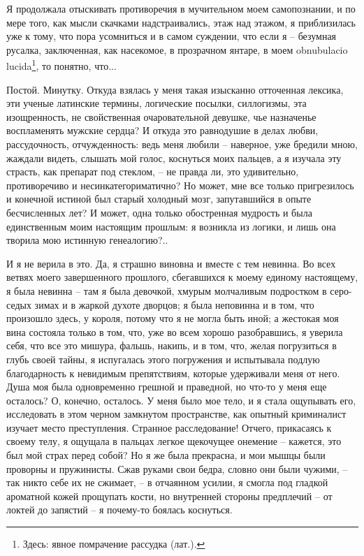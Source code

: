 Я  продолжала отыскивать  противоречия  в мучительном  моем самопознании,  и
по  мере  того,  как  мысли  скачками надстраивались,  этаж  над  этажом,  я
приблизилась уже к тому, что пора усомниться  и в самом суждении, что если я
-- безумная русалка, заключенная, как насекомое, в прозрачном янтаре, в моем
obnubulacio  lucida\footnote{Здесь: явное  помрачение рассудка  (лат.).}, то
понятно, что...

Постой.  Минутку.  Откуда  взялась  у  меня  такая изысканно отточенная
лексика, эти ученые латинские термины, логические посылки,  силлогизмы,  эта
изощренность,   не   свойственная  очаровательной  девушке,  чье  назначенье
воспламенять  мужские  сердца?  И  откуда  это  равнодушие  в  делах  любви,
рассудочность,  отчужденность:  ведь  меня  любили  -- наверное, уже бредили
мною, жаждали видеть, слышать мой голос, коснуться моих пальцев, а я изучала
эту страсть, как препарат под стеклом, -- не  правда  ли,  это  удивительно,
противоречиво  и несинкатегориматично? Но может, мне все только пригрезилось
и  конечной  истиной  был  старый  холодный  мозг,  запутавшийся   в   опыте
бесчисленных   лет?  И  может,  одна  только  обостренная  мудрость  и  была
единственным моим настоящим прошлым:  я  возникла  из  логики,  и  лишь  она
творила мою истинную генеалогию?..

И я не верила  в это. Да, я страшно виновна и вместе  с тем невинна. Во всех
ветвях моего завершенного прошлого,  сбегавшихся к моему единому настоящему,
я  была невинна  --  там я  была девочкой,  хмурым  молчаливым подростком  в
серо-седых зимах и  в жаркой духоте дворцов;  я была неповинна и  в том, что
произошло здесь, у короля,  потому что я не могла быть  иной; а жестокая моя
вина  состояла  только в  том,  что,  уже  во  всем хорошо  разобравшись,  я
уверила  себя, что  все это  мишура,  фальшь, накипь,  и в  том, что,  желая
погрузиться в глубь своей тайны,  я испугалась этого погружения и испытывала
подлую благодарность  к невидимым  препятствиям, которые удерживали  меня от
него.  Душа моя  была одновременно  грешной и  праведной, но  что-то у  меня
еще  осталось?  О, конечно,  осталось.  У  меня было  мое  тело,  и я  стала
ощупывать его, исследовать в этом черном замкнутом пространстве, как опытный
криминалист  изучает  место  преступления. Странное  расследование!  Отчего,
прикасаясь к своему  телу, я ощущала в пальцах легкое  щекочущее онемение --
кажется, это был мой страх перед собой?  Но я же была прекрасна, и мои мышцы
были проворны и пружинисты. Сжав руками  свои бедра, словно они были чужими,
-- так никто себе их не сжимает, -- в отчаянном усилии, я смогла под гладкой
ароматной  кожей прощупать  кости, но  внутренней стороны  предплечий --  от
локтей до запястий -- я почему-то боялась коснуться.

